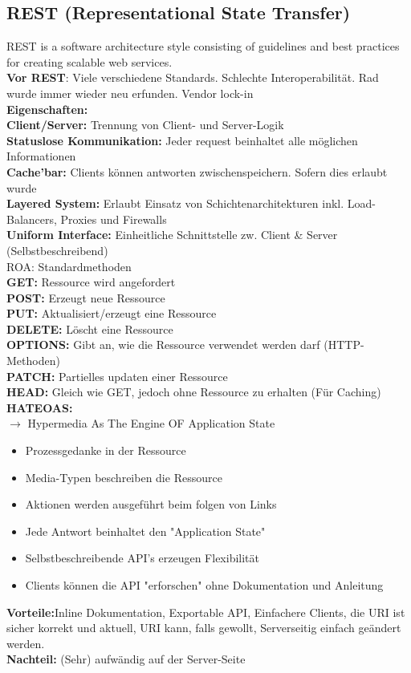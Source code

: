 \documentclass[7pt,landscape,a4paper]{scrartcl}
\begin{document}
\begin{multicols*}{4}
\section{REST (Representational State Transfer)}
	REST is a software architecture style consisting of guidelines and best practices for creating scalable web	services.\\
	\textbf{Vor REST}: Viele verschiedene Standards. Schlechte Interoperabilität. Rad wurde immer wieder neu erfunden. Vendor lock-in\\
	\textcolor{b}{\textbf{Eigenschaften:}}\\
	\textbf{Client/Server:} Trennung von Client- und Server-Logik\\
	\textbf{Statuslose Kommunikation:} Jeder request beinhaltet alle möglichen Informationen\\
	\textbf{Cache'bar:} Clients können antworten zwischenspeichern. Sofern dies erlaubt wurde\\
	\textbf{Layered System:} Erlaubt Einsatz von Schichtenarchitekturen inkl. Load-Balancers, Proxies und Firewalls\\
	\textbf{Uniform Interface:} Einheitliche Schnittstelle zw. Client \& Server (Selbstbeschreibend)\\
	\textcolor{b}{ROA: Standardmethoden}\\
	\textbf{GET:} Ressource wird angefordert\\
	\textbf{POST:} Erzeugt neue Ressource\\
	\textbf{PUT:} Aktualisiert/erzeugt eine Ressource\\
	\textbf{DELETE:} Löscht eine Ressource\\
	\textbf{OPTIONS:} Gibt an, wie die Ressource verwendet werden darf (HTTP-Methoden)\\
	\textbf{PATCH:} Partielles updaten einer Ressource\\
	\textbf{HEAD:} Gleich wie GET, jedoch ohne Ressource zu erhalten (Für Caching)\\
	\textcolor{b}{\textbf{HATEOAS:}}\\
	$\rightarrow$ Hypermedia As The Engine OF Application State
	\begin{itemize}[topsep=0pt, leftmargin=3mm]
		\setlength\itemsep{-0.3em}
		\item Prozessgedanke in der Ressource
		\item Media-Typen beschreiben die Ressource
		\item Aktionen werden ausgeführt beim folgen von Links
		\item Jede Antwort beinhaltet den "Application State"
		\item Selbstbeschreibende API’s erzeugen Flexibilität
		\item Clients können die API "erforschen" ohne Dokumentation und Anleitung
	\end{itemize}
	\textbf{Vorteile:}Inline Dokumentation, Exportable API, Einfachere Clients, die URI ist sicher korrekt und aktuell, URI kann, falls gewollt, Serverseitig einfach geändert werden.\\
	\textbf{Nachteil:} (Sehr) aufwändig auf der Server-Seite

\end{multicols*}
\end{document}
